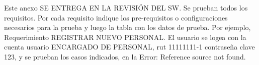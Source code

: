 Este anexo SE ENTREGA EN LA REVISIÓN DEL SW.
Se prueban todos los requisitos.
Por cada requisito indique los pre-requisitos o configuraciones necesarios para la prueba y luego la tabla con los datos de prueba. 
Por ejemplo, Requerimiento REGISTRAR NUEVO PERSONAL. El usuario se logea con la cuenta usuario ENCARGADO DE PERSONAL, rut 11111111-1 contraseña clave 123, y se prueban los casos indicados, en la Error: Reference source not found.